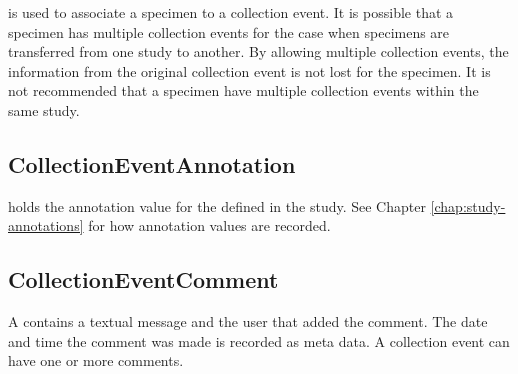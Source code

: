  is used to associate a specimen to a
collection event. It is possible that a specimen has multiple collection events
for the case when specimens are transferred from one study to another. By
allowing multiple collection events, the information from the original
collection event is not lost for the specimen. It is not recommended that a
specimen have multiple collection events within the same study.

\subsection*{CollectionEventAnnotation}
 holds the annotation value for the
 defined in the study. See
Chapter \ref{chap:study-annotations} for how annotation values are recorded.

\subsection*{CollectionEventComment}
A  contains a textual message and the user
that added the comment. The date and time the comment was made is recorded as
meta data. A collection event can have one or more comments.



